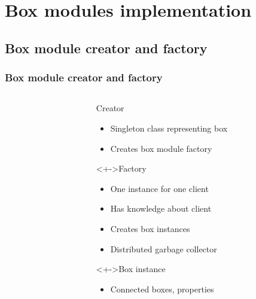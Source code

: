 \documentclass[handout]{beamer}
\begin{document}
\section{Box modules implementation}

\subsection{Box module creator and factory}
\begin{frame}
	\frametitle{Box module creator and factory}
	\begin{columns}
		\begin{column}{5cm}
		\end{column}
		\begin{column}{6cm}	
			\begin{block}{Creator}
				\begin{itemize}[<+->]
					\item Singleton class representing box
					\item Creates box module factory
				\end{itemize}
			\end{block}
			\begin{block}<+->{Factory}
				\begin{itemize}[<+->]
					\item One instance for one client
					\item Has knowledge about client
					\item Creates box instances
					\item Distributed garbage collector
				\end{itemize}	
			\end{block}
			\begin{block}<+->{Box instance}
				\begin{itemize}[<+->]
					\item Connected boxes, properties
				\end{itemize}	
			\end{block}
		\end{column}
	\end{columns}
\end{frame}
\end{document}
